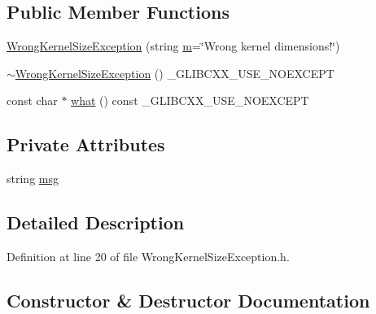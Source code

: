 \subsection*{Public Member Functions}
\begin{DoxyCompactItemize}
\item 
\hyperlink{class_vision_1_1_exception_1_1_wrong_kernel_size_exception_aa508534e1d81ab9b14e8abf156660fb4}{Wrong\+Kernel\+Size\+Exception} (string \hyperlink{_gen_blob_8m_ab3cd915d758008bd19d0f2428fbb354a}{m}=\char`\"{}Wrong kernel dimensions!\char`\"{})
\item 
\hyperlink{class_vision_1_1_exception_1_1_wrong_kernel_size_exception_a9b7e79b2201337021162b6685365cbb9}{$\sim$\+Wrong\+Kernel\+Size\+Exception} () \+\_\+\+G\+L\+I\+B\+C\+X\+X\+\_\+\+U\+S\+E\+\_\+\+N\+O\+E\+X\+C\+E\+P\+T
\item 
const char $\ast$ \hyperlink{class_vision_1_1_exception_1_1_wrong_kernel_size_exception_a5be675f9584d0c16a98bdb97f75d3287}{what} () const \+\_\+\+G\+L\+I\+B\+C\+X\+X\+\_\+\+U\+S\+E\+\_\+\+N\+O\+E\+X\+C\+E\+P\+T
\end{DoxyCompactItemize}
\subsection*{Private Attributes}
\begin{DoxyCompactItemize}
\item 
string \hyperlink{class_vision_1_1_exception_1_1_wrong_kernel_size_exception_a1d5f333a2deb78a3c696ec11f6bc7224}{msg}
\end{DoxyCompactItemize}


\subsection{Detailed Description}


Definition at line 20 of file Wrong\+Kernel\+Size\+Exception.\+h.



\subsection{Constructor \& Destructor Documentation}
\hypertarget{class_vision_1_1_exception_1_1_wrong_kernel_size_exception_aa508534e1d81ab9b14e8abf156660fb4}{}
